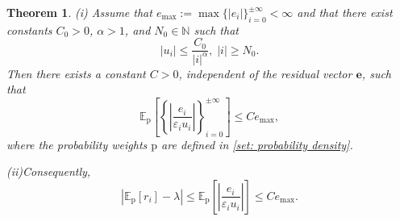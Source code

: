 \documentclass[11pt]{article}
\newtheorem{thm}{Theorem}[section]
\numberwithin{equation}{section}
\begin{document}
\begin{thm} \label{thm: ratio expectation}
    (i) Assume that $e_{\max} := \max \{|e_i|\}_{i=0}^{\pm \infty} < \infty$ and that there exist constants $C_0>0$, $\alpha>1$, and $N_0\in\mathbb{N}$ such that
    $$|u_i| \le \frac{C_0}{|i|^\alpha}, \; |i|\ge N_0.$$
    Then there exists a constant $C>0$, independent of the residual vector $\mathbf e$, such that
    \begin{equation} \label{neq: expectation estimate}
    \mathbb{E}_{\mathrm{p}}\left[\left\{ \left| \frac{e_i}{\varepsilon_i u_i} \right|\right\}_{i=0}^{\pm \infty}\right]
    \le C e_{\max},
    \end{equation}
    where the probability weights $\mathrm p$ are defined in \eqref{set: probability density}.

    (ii)Consequently,
    \begin{equation} \label{neq: expectation boundary}
    \left| \mathbb{E}_{\mathrm{p}}[r_i] - \lambda \right|
    \le
    \mathbb{E}_{\mathrm{p}}\left[\left| \frac{e_i}{\varepsilon_i u_i} \right|\right]
    \le C e_{\max}.
    \end{equation}

\end{thm}

\end{document}
